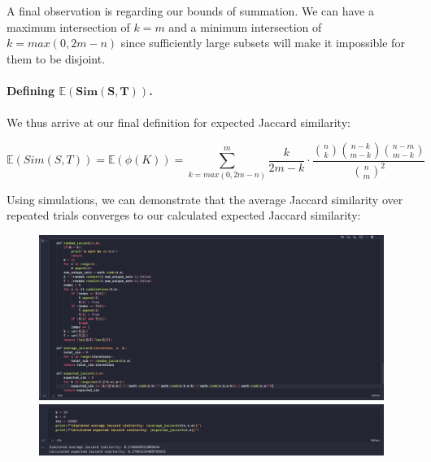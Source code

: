 \documentclass{article}
\begin{document}
\begin{enumerate}[label=\alph*., left=10pt, itemsep=10pt]
\begin{minipage}[t]{0.9\textwidth}
            A final observation is regarding our bounds of summation. We can have a maximum intersection of $k=m$ and a minimum
            intersection of $k = max(0, 2m-n)$ since sufficiently large subsets will make it impossible for them to be disjoint.\\\\
            
            \textbf{Defining $\mathbf{\mathbb{E}(Sim(S,T))}$.}\\\\
            We thus arrive at our final definition for expected Jaccard similarity:

            \begin{equation}
                \mathbb{E}(Sim(S,T)) = \mathbb{E}(\phi(K)) = \sum\limits_{k = max(0,2m-n)}^{m} \frac{k}{2m-k}\cdot \frac{\binom{n}{k}\binom{n-k}{m-k}\binom{n-m}{m-k}}{\binom{n}{m}^{2}}                
            \end{equation}
            
            \end{minipage}
            \newpage
            \begin{minipage}[t]{0.9\textwidth}
            Using simulations, we can demonstrate that the average Jaccard similarity over repeated trials converges to our
            calculated expected Jaccard similarity:
            \begin{figure}[H]
                \centering
                \includegraphics[width=1\textwidth, height=0.35\textheight]{./5bi.png}
                \includegraphics[width=1\textwidth, height=0.1\textheight]{./5bii.png}
            \end{figure}


\end{minipage}
\end{enumerate}
\end{document}
